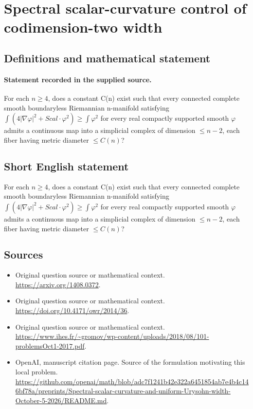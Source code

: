 \documentclass[11pt]{article}
\begin{document}
\section*{Spectral scalar-curvature control of codimension-two width}\label{statement}
\subsection{Definitions and mathematical statement}
\paragraph{Statement recorded in the supplied source.}
For each $n\geq 4$, does a constant C(n) exist such that every connected complete smooth boundaryless Riemannian n-manifold satisfying $\int (4|\nabla \varphi |^{2}+Scal\cdot \varphi ^{2})\geq \int \varphi ^{2}$ for every real compactly supported smooth $\varphi $ admits a continuous map into a simplicial complex of dimension $\leq n-2$, each fiber having metric diameter $\leq C(n)$?
\subsection{Short English statement}
For each $n\geq 4$, does a constant C(n) exist such that every connected complete smooth boundaryless Riemannian n-manifold satisfying $\int (4|\nabla \varphi |^{2}+Scal\cdot \varphi ^{2})\geq \int \varphi ^{2}$ for every real compactly supported smooth $\varphi $ admits a continuous map into a simplicial complex of dimension $\leq n-2$, each fiber having metric diameter $\leq C(n)$?
\subsection{Sources}
\begin{itemize}
\item[S1] Original question source or mathematical context.
\url{https://arxiv.org/1408.0372}.
\item[S2] Original question source or mathematical context.
\url{https://doi.org/10.4171/owr/2014/36}.
\item[S3] Original question source or mathematical context.
\url{https://www.ihes.fr/~gromov/wp-content/uploads/2018/08/101-problemsOct1-2017.pdf}.
\item[S4] OpenAI, manuscript citation page. Source of the formulation motivating this local problem.
\url{https://github.com/openai/math/blob/adc7f1241b42e322a6451854ab7e4b4c146bf78a/preprints/Spectral-scalar-curvature-and-uniform-Urysohn-width-October-5-2026/README.md}.
\end{itemize}
\end{document}
